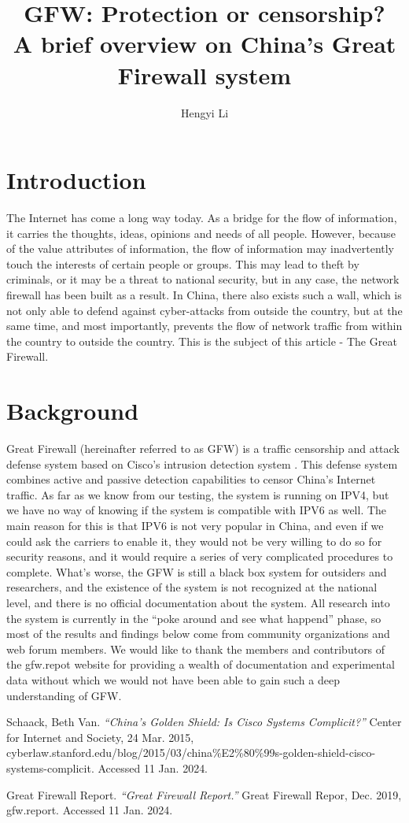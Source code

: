 \documentclass[11pt]{article}
\title{GFW: Protection or censorship?\\ \large A brief overview on China's Great Firewall system}
\author{Hengyi Li}
\begin{document}
\maketitle

\section{Introduction}

The Internet has come a long way today. As a bridge for the flow of information,
it carries the thoughts, ideas, opinions and needs of all people. However,
because of the value attributes of information, the flow of information may
inadvertently touch the interests of certain people or groups. This may lead to
theft by criminals, or it may be a threat to national security, but in any case,
the network firewall has been built as a result. In China, there also exists
such a wall, which is not only able to defend against cyber-attacks from outside
the country, but at the same time, and most importantly, prevents the flow of
network traffic from within the country to outside the country. This is the
subject of this article - The Great Firewall.

\section{Background}
Great Firewall (hereinafter referred to as GFW) is a traffic censorship and
attack defense system based on Cisco's intrusion detection system \cite{CISCO}.
This defense system combines active and passive detection capabilities to censor
China's Internet traffic. As far as we know from our testing, the system is
running on IPV4, but we have no way of knowing if the system is compatible with
IPV6 as well. The main reason for this is that IPV6 is not very popular in China,
and even if we could ask the carriers to enable it, they would not be very
willing to do so for security reasons, and it would require a series of very
complicated procedures to complete. What's worse, the GFW is still a black box
system for outsiders and researchers, and the existence of the system is not
recognized at the national level, and there is no official documentation about
the system. All research into the system is currently in the ``poke around and
see what happend'' phase, so most of the results and findings below come from
community organizations and web forum members. We would like to thank the
members and contributors of the gfw.repot \cite{GFWReport} website for providing a wealth of
documentation and experimental data without which we would not have been able to
gain such a deep understanding of GFW.
\newpage

\begin{thebibliography}{9}
Schaack, Beth Van. \textit{``China's Golden Shield: Is Cisco Systems Complicit?''} Center
for Internet and Society, 24 Mar. 2015, cyberlaw.stanford.edu/blog/2015/03/china\%E2\%80\%99s-golden-shield-cisco-systems-complicit.
Accessed 11 Jan. 2024.

Great Firewall Report. \textit{``Great Firewall Report.''} Great Firewall Repor, Dec. 2019,
gfw.report. Accessed 11 Jan. 2024.
\end{thebibliography}
\end{document}
